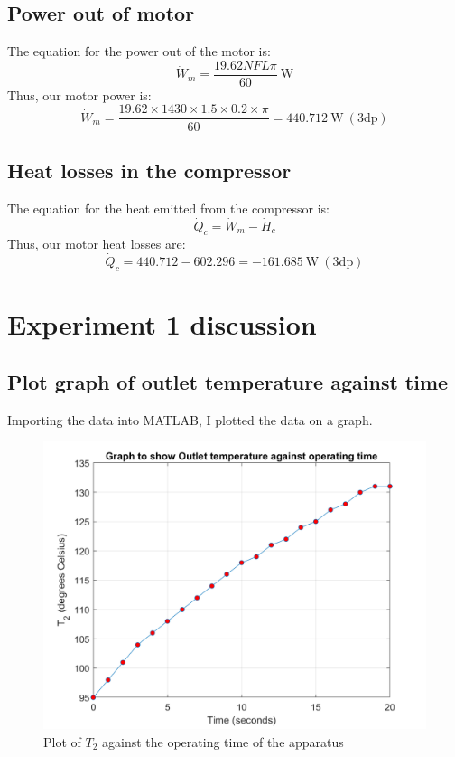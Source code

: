 \documentclass[class=article, crop=false, 12pt,a4paper]{standalone}
\begin{document}
\subsection{Power out of motor}
The equation for the power out of the motor is:
\begin{equation}
  \dot{W}_{m} = \frac{19.62NFL\pi}{60} \ \si{\watt}
  \label{motorpower}
\end{equation}
Thus, our motor power is:
\[ \dot{W}_{m} = \frac{19.62 \times 1430 \times 1.5 \times 0.2 \times \pi}{60} = 440.712 \ \si{\watt} \ (3\textrm{dp}) \]
\subsection{Heat losses in the compressor}
The equation for the heat emitted from the compressor is:
\begin{equation}
  \dot{Q}_c = \dot{W}_m - \dot{H}_c
  \label{heatlosscompressor}
\end{equation}
Thus, our motor heat losses are:
\[ \dot{Q}_c = 440.712 - 602.296 = -161.685 \ \si{\watt} \ (3\textrm{dp}) \]
\section{Experiment 1 discussion}
\subsection{Plot graph of outlet temperature against time}
Importing the data into MATLAB, I plotted the data on a graph.
\begin{figure}
  \includegraphics[width = \textwidth]{./img/T2vsTimeGraph}
  \caption{Plot of \(T_2\) against the operating time of the apparatus}
  \label{ref:T2vsTime}
\end{figure}
\end{document}
